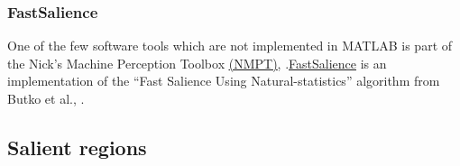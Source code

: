 \subsubsection{FastSalience}\label{soft:fastsal:subsec}
One of the few software tools which are not implemented in MATLAB is part of the Nick's Machine Perception Toolbox \href{http://mplab.ucsd.edu/~nick/NMPT/main.html}{\underline{(NMPT)}}, \cite{nmpt_soft}.\href{http://mplab.ucsd.edu/~nick/NMPT/class_fast_salience.html}{\underline{FastSalience}} is an implementation of the ``Fast Salience Using Natural-statistics'' algorithm from Butko et al., \cite{ButkoZCM08}.

\subsection{Salient regions}\label{soft:salreg:sec}

